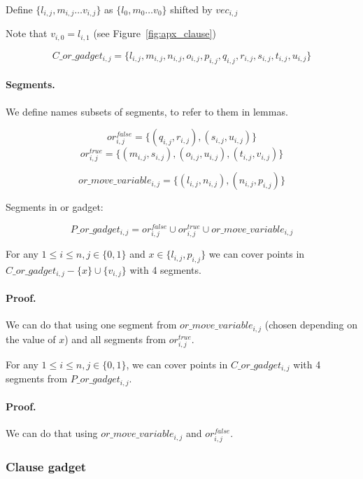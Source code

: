 	Define 
	$\{ l_{i, j}, m_{i, j} \ldots v_{i, j} \}$
	as $\{l_0, m_0 \ldots v_0\}$ shifted by $vec_{i, j}$

Note that $v_{i, 0} = l_{i, 1}$ (see Figure~\ref{fig:apx_clause})
 
  $$C\_or\_gadget_{i, j} = 
 \{l_{i, j}, m_{i, j}, n_{i, j}, o_{i, j},
 p_{i, j}, q_{i, j}, r_{i, j}, s_{i, j}, t_{i, j}, u_{i, j} \}
 $$
 
\paragraph{Segments.}

We define names subsets of segments, to refer to them in lemmas.
 
$$or^{false}_{i, j} =
\{ (q_{i, j}, r_{i, j}), (s_{i, j}, u_{i, j})\}$$
$$or^{true}_{i, j} =
\{ (m_{i, j}, s_{i, j}), (o_{i, j}, u_{i, j}),
(t_{i, j}, v_{i, j}) \}$$

$$or\_move\_variable_{i, j} =
\{ (l_{i, j}, n_{i, j}), (n_{i, j}, p_{i, j})\}$$

Segments in or gadget:

$$P\_or\_gadget_{i, j} = 
  or^{false}_{i, j} \cup or^{true}_{i, j} \cup or\_move\_variable_{i, j}
  $$


\begin{lemma}
\label{cover_or_true}
For any $1 \le i \le n, j \in \{0, 1\}$ and 
 $x \in \{l_{i, j}, p_{i, j}\}$ we can cover points in
$C\_or\_gadget_{i, j} - \{ x\} \cup \{v_{i, j}\}$
with 4 segments.
\end{lemma}

\paragraph{Proof.}
We can do that using one segment from
$or\_move\_variable_{i, j}$
(chosen depending on the value of $x$)
and all segments from $or^{true}_{i, j}$.

\begin{lemma}
\label{cover_or_false}
For any $1 \le i \le n, j \in \{0, 1\}$, we can cover points in
$C\_or\_gadget_{i, j}$ with 4 segments from $P\_or\_gadget_{i,j}$.
\end{lemma}
\paragraph{Proof.}
We can do that using  $or\_move\_variable_{i, j}$
and $or^{false}_{i, j}$.


\subsubsection{Clause gadget}

